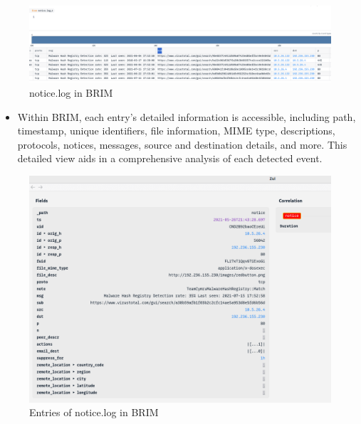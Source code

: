 \begin{figure}[H]
    \centering
    \includegraphics[width=1\linewidth]{images//UDP_reflection/file_malware_7.png}
    \caption{notice.log in BRIM}
    \label{fig:enter-label}
\end{figure}

\begin{itemize}
    \item Within BRIM, each entry's detailed information is accessible, including path, timestamp, unique identifiers, file information, MIME type, descriptions, protocols, notices, messages, source and destination details, and more. This detailed view aids in a comprehensive analysis of each detected event.
\end{itemize}
\begin{figure}[H]
    \centering
    \includegraphics[width=0.7\linewidth]{images//file_malware/file_malware_3.png}
    \caption{Entries of notice.log in BRIM}
    \label{fig:enter-label}
\end{figure}

